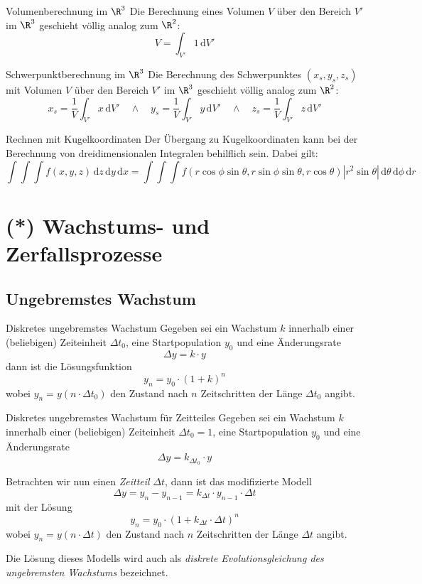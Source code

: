 \documentclass[german]{../spicker}
\renewcommand{\d}{\,\mathrm{d}}
\renewcommand{\abs}[1]{\left| #1 \right|}
\begin{document}
\begin{bonus}{Volumenberechnung im $\R^3$}
    Die Berechnung eines Volumen $V$ über den Bereich $V'$ im $\R^3$ geschieht völlig analog zum $\R^2$:
    $$
        V = \int_{V'} 1 \d V'
    $$
\end{bonus}

\begin{bonus}{Schwerpunktberechnung im $\R^3$}
    Die Berechnung des Schwerpunktes $(x_s, y_s, z_s)$ mit Volumen $V$ über den Bereich $V'$ im $\R^3$ geschieht völlig analog zum $\R^2$:
    $$
        x_s = \frac{1}{V}\int_{V'} x \d V' \quad \land \quad y_s = \frac{1}{V}\int_{V'} y \d V' \quad \land \quad z_s = \frac{1}{V}\int_{V'} z \d V'
    $$
\end{bonus}

\begin{bonus}{Rechnen mit Kugelkoordinaten}
    Der Übergang zu Kugelkoordinaten kann bei der Berechnung von dreidimensionalen Integralen behilflich sein.
    Dabei gilt:
    $$
        \int\int\int f(x,y,z) \d z\d y\d x = \int\int\int f(r\cos\phi\sin\theta, r\sin\phi\sin\theta, r\cos\theta) \abs{r^2\sin\theta} \d\theta\d\phi\d r
    $$
\end{bonus}

\section{(*) Wachstums- und Zerfallsprozesse}

\subsection{Ungebremstes Wachstum}

\begin{defi}{Diskretes ungebremstes Wachstum}
    Gegeben sei ein Wachstum $k$ innerhalb einer (beliebigen) Zeiteinheit $\Delta t_0$, eine Startpopulation $y_0$ und eine Änderungsrate
    $$
        \Delta y = k\cdot y
    $$
    dann ist die Lösungsfunktion
    $$
        \boxed{y_n = y_0\cdot (1+k)^n}
    $$
    wobei $y_n = y(n\cdot \Delta t_0)$ den Zustand nach $n$ Zeitschritten der Länge $\Delta t_0$ angibt.
\end{defi}

\begin{bonus}{Diskretes ungebremstes Wachstum für Zeitteile}s
    Gegeben sei ein Wachstum $k$ innerhalb einer (beliebigen) Zeiteinheit $\Delta t_0 = 1$, eine Startpopulation $y_0$ und eine Änderungsrate
    $$
        \Delta y = k_{\Delta t_0}\cdot y
    $$

    Betrachten wir nun einen \emph{Zeitteil} $\Delta t$, dann ist das modifizierte Modell
    $$
        \Delta y = y_n - y_{n-1} = k_{\Delta t}\cdot  y_{n-1}\cdot  \Delta t
    $$
    mit der Lösung
    $$
        \boxed{y_n = y_0\cdot (1 + k_{\Delta t} \cdot \Delta t)^n}
    $$
    wobei $y_n = y(n\cdot \Delta t)$ den Zustand nach $n$ Zeitschritten der Länge $\Delta t$ angibt.

    Die Lösung dieses Modells wird auch als \emph{diskrete Evolutionsgleichung des ungebremsten Wachstums} bezeichnet.
\end{bonus}
\end{document}
